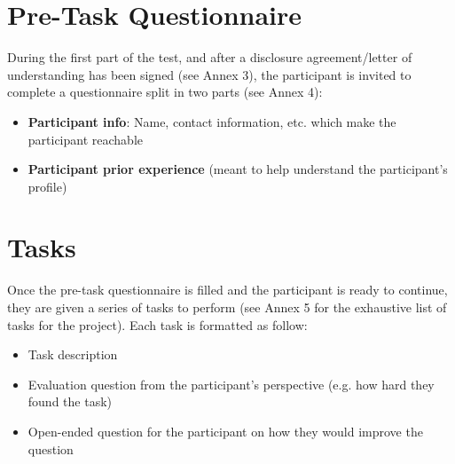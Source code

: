 \documentclass[twocolumn, letterpaper,13pt]{scrartcl}
\begin{document}
    \section*{Pre-Task Questionnaire}
    
    During the first part of the test, and after a disclosure agreement/letter of understanding has been signed (see Annex 3), the participant is invited to complete a questionnaire split in two parts (see Annex 4):
    \begin{itemize}
        \item \textbf{Participant info}: Name, contact information, etc. which make the participant reachable
        \item \textbf{Participant prior experience} (meant to help understand the participant's profile)
    \end{itemize}
    
    \section*{Tasks}
    
    Once the pre-task questionnaire is filled and the participant is ready to continue, they are given a series of tasks to perform (see Annex 5 for the exhaustive list of tasks for the project). Each task is formatted as follow:
    \begin{itemize}
        \item Task description
        \item Evaluation question from the participant's perspective (e.g. how hard they found the task)
        \item Open-ended question for the participant on how they would improve the question
    \end{itemize}
    
\end{document}
